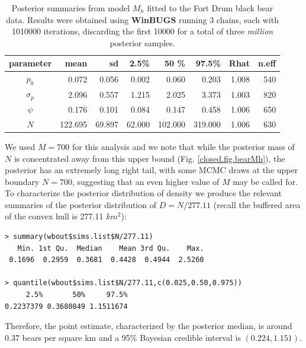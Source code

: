 \begin{table}[ht]
  \caption{
    Posterior summaries from model $M_h$ fitted to the Fort Drum black
    bear data. Results 
    were obtained using {\bf WinBUGS}
    running 3 chains, each with 1010000 iterations, discarding the
    first 10000 for a total of three {\it million} posterior samples. 
}
\begin{tabular}{crrrrrrr} \hline \hline
 parameter &  mean   &  sd    &   2.5\% &  50 \%  &   97.5\% &Rhat& n.eff  \\ \hline
$p_0$      &   0.072 & 0.056  &   0.002 &  0.060  &   0.203  &1.008 &
540  \\ 
$\sigma_p$ &    2.096&  0.557 &   1.215 &  2.025  &   3.373  &1.003 &
820 \\ 
$\psi$     &    0.176&  0.101 &   0.084 &  0.147  &   0.458  & 1.006&
650 \\ 
$N$        & 122.695 &69.897  &  62.000 & 102.000 & 319.000  &1.006 &
630 \\ \hline
\end{tabular}
\label{closed.tab.bear}
\end{table}


We used $M=700$ for this analysis and we
note that  while the posterior mass of $N$ is concentrated away from this
upper bound (Fig. \ref{closed.fig.bearMh}), the posterior has an
extremely long right tail, with some MCMC draws at the upper
boundary $N=700$, suggesting that an even higher value of $M$ may be
called for.
To characterize the posterior distribution of density we produce the
relevant summaries of the posterior distribution of $D  = N/277.11$
(recall
the buffered area of the convex hull is 277.11 $km^2$):
{\small
\begin{verbatim}
> summary(wbout$sims.list$N/277.11)
   Min. 1st Qu.  Median    Mean 3rd Qu.    Max.
 0.1696  0.2959  0.3681  0.4428  0.4944  2.5260

> quantile(wbout$sims.list$N/277.11,c(0.025,0.50,0.975))
     2.5%       50%     97.5%
0.2237379 0.3680849 1.1511674
\end{verbatim}
}
{\flushleft Therefore}, the point estimate, characterized by the posterior median, is around
$0.37$ bears per square km and a 95\% Bayesian credible interval is
$(0.224, 1.151)$.


